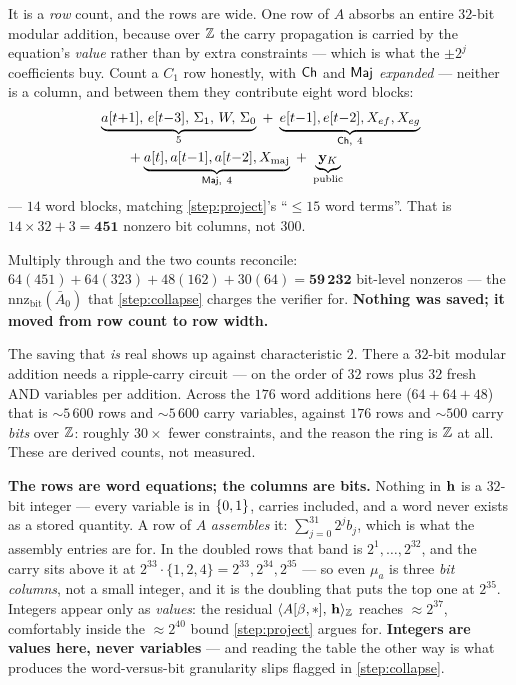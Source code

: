 \noindent
\begin{remark}\label{rem:rowsvswidth}
It is a \emph{row} count, and the rows are wide. One row of $A$ absorbs an
entire $32$-bit modular addition, because over $\mathbb{Z}$ the carry propagation is
carried by the equation's \emph{value} rather than by extra constraints ---
which is what the $\pm2^j$ coefficients buy. Count a $C_1$ row honestly, with
$\mathsf{Ch}$ and $\mathsf{Maj}$ \emph{expanded} --- neither is a column, and between them they
contribute eight word blocks:
\begin{align*}
  &\underbrace{a[t{+}1],\,e[t{-}3],\,\Sigma_1,\,W,\,\Sigma_0}_{5}
  \;+\;\underbrace{e[t{-}1],e[t{-}2],X_{ef},X_{eg}}_{\mathsf{Ch},\ 4}\\[-2pt]
  &\qquad
  +\underbrace{a[t],a[t{-}1],a[t{-}2],X_{\mathrm{maj}}}_{\mathsf{Maj},\ 4}
  \;+\;\underbrace{\mathbf y_K}_{\text{public}}
\end{align*}
--- $14$ word blocks, matching \cref{step:project}'s ``$\leq15$ word terms''.
That is $14\times32+3=\mathbf{451}$ nonzero bit columns, not $300$.

Multiply through and the two counts reconcile:
$64(451)+64(323)+48(162)+30(64)=\mathbf{59\,232}$ bit-level nonzeros --- the
$\mathrm{nnz}_{\mathrm{bit}}(\bar A_0)$ that \cref{step:collapse} charges the
verifier for. \textbf{Nothing was saved; it moved from row count to row width.}

The saving that \emph{is} real shows up against characteristic $2$. There a
$32$-bit modular addition needs a ripple-carry circuit --- on the order of $32$
rows plus $32$ fresh AND variables per addition. Across the $176$ word additions
here ($64+64+48$) that is $\sim\!5\,600$ rows and $\sim\!5\,600$ carry
variables, against $176$ rows and $\sim\!500$ carry \emph{bits} over $\mathbb{Z}$:
roughly $30\times$ fewer constraints, and the reason the ring is $\mathbb{Z}$ at all.
These are derived counts, not measured.
\end{remark}

\noindent
\textbf{The rows are word equations; the columns are bits.} Nothing in $\mathbf{h}$ is
a $32$-bit integer --- every variable is in $\{0,1\}$, carries included, and a
word never exists as a stored quantity. A row of $A$ \emph{assembles} it:
$\sum_{j=0}^{31}2^j b_j$, which is what the assembly entries are for. In the
doubled rows that band is $2^1,\dots,2^{32}$, and the carry sits above it at
$2^{33}\!\cdot\!\{1,2,4\}=2^{33},2^{34},2^{35}$ --- so even $\mu_a$ is three
\emph{bit columns}, not a small integer, and it is the doubling that puts the
top one at $2^{35}$. Integers appear only as \emph{values}: the
residual $\langle A[\beta,*],\, \mathbf{h}\rangle_{\mathbb{Z}}$ reaches $\approx2^{37}$, comfortably inside the
$\approx2^{40}$ bound \cref{step:project} argues for. \textbf{Integers are values here, never
variables} --- and reading the table the other way is what produces the
word-versus-bit granularity slips flagged in \cref{step:collapse}.

